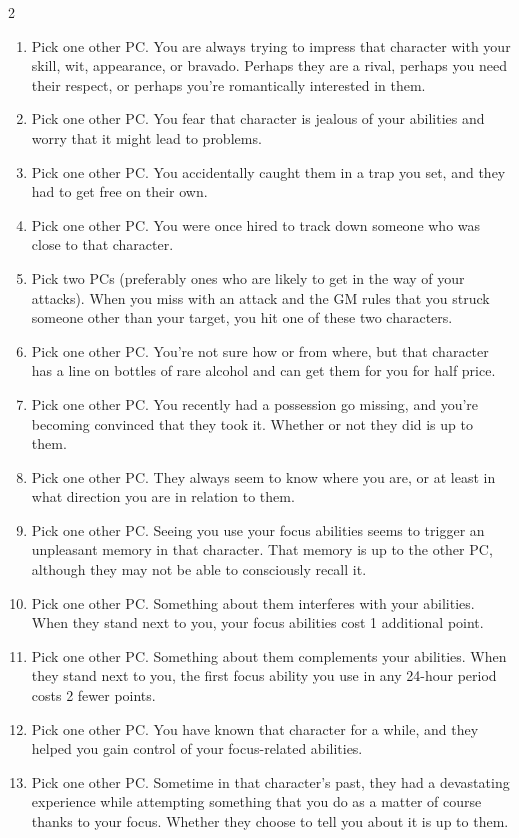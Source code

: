 \begin{multicols}{2}
\begin{enumerate}
\item Pick one other PC. You are always trying to impress that character with your skill, wit, appearance, or bravado. Perhaps they are a rival, perhaps you need their respect, or perhaps you’re romantically interested in them.
\item Pick one other PC. You fear that character is jealous of your abilities and worry that it might lead to problems.
\item Pick one other PC. You accidentally caught them in a trap you set, and they had to get free on their own.
\item Pick one other PC. You were once hired to track down someone who was close to that character.
\item Pick two PCs (preferably ones who are likely to get in the way of your attacks). When you miss with an attack and the GM rules that you struck someone other than your target, you hit one of these two characters.
\item Pick one other PC. You’re not sure how or from where, but that character has a line on bottles of rare alcohol and can get them for you for half price.
\item Pick one other PC. You recently had a possession go missing, and you’re becoming convinced that they took it. Whether or not they did is up to them.
\item Pick one other PC. They always seem to know where you are, or at least in what direction you are in relation to them.
\item Pick one other PC. Seeing you use your focus abilities seems to trigger an unpleasant memory in that character. That memory is up to the other PC, although they may not be able to consciously recall it.
\item Pick one other PC. Something about them interferes with your abilities. When they stand next to you, your focus abilities cost 1 additional point.
\item Pick one other PC. Something about them complements your abilities. When they stand next to you, the first focus ability you use in any 24-hour period costs 2 fewer points.
\item Pick one other PC. You have known that character for a while, and they helped you gain control of your focus-related abilities.
\item Pick one other PC. Sometime in that character’s past, they had a devastating experience while attempting something that you do as a matter of course thanks to your focus. Whether they choose to tell you about it is up to them.

\end{enumerate}
\end{multicols}
